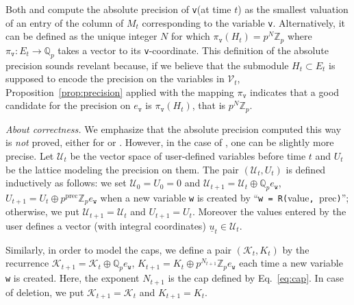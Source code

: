 \documentclass[sigconf]{acmart}
\newcommand{\Z}{\mathbb Z}
\newcommand{\Zp}{\Z_p}
\newcommand{\Q}{\mathbb Q}
\newcommand{\Qp}{\Q_p}
\newcommand{\calV}{\mathcal{V}}
\newcommand{\ttv}{\texttt{v}\xspace}
\newcommand{\ttw}{\texttt{w}\xspace}
\newcommand{\calU}{\mathcal{U}}
\newcommand{\calK}{\mathcal{K}}
\newcommand{\ZpLC}{\text{\color{output} \rm \tt ZpLC}\xspace}
\newcommand{\ZpLF}{\text{\color{output} \rm \tt ZpLF}\xspace}
\theoremstyle{definition}
\begin{document}
\noindent
Both \ZpLC and \ZpLF compute the absolute precision of \ttv (at time 
$t$) as the smallest valuation of an entry of the column of $M_t$ 
corresponding to the variable \ttv. Alternatively, it can be defined as 
the unique integer $N$ for which $\pi_\ttv(H_t) = p^N \Zp$ where 
$\pi_\ttv : E_t \to \Qp$ takes a vector to its \ttv-coordinate.
This definition of the absolute precision sounds revelant because, if we 
believe that the submodule $H_t \subset E_t$ is supposed to encode the 
precision on the variables in $\calV_t$, 
Proposition~\ref{prop:precision} applied with the mapping $\pi_\ttv$ 
indicates that a good candidate for the precision on $e_\ttv$ is 
$\pi_\ttv(H_t)$, that is $p^N \Zp$.

\medskip

\noindent \textit{About correctness.}
%
We emphasize that the absolute precision computed this way is \emph{not} 
proved, either for \ZpLF or \ZpLC. However, in the case of \ZpLC, one
can be slightly more precise. Let $\calU_t$ be the vector space of 
user-defined variables before time $t$ and $U_t$ be the lattice
modeling the precision on them. The pair $(\calU_t, U_t)$ is defined 
inductively as follows: we set $\calU_0 = U_0 = 0$ and 
$\calU_{t+1} = \calU_t \oplus \Qp e_\ttw$,
$U_{t+1} = U_t \oplus p^{\text{prec}} \Zp e_\ttw$
when a new variable \ttw is created by
``\verb?w = R(?value\verb?, ?prec\verb?)?''; otherwise, we put 
$\calU_{t+1} = \calU_t$ and $U_{t+1} = U_t$. Moreover the values
entered by the user defines a vector (with integral coordinates)
$\underline u_t \in \calU_t$.

Similarly, in order to model the caps, we define a pair $(\calK_t, 
K_t)$ by the recurrence $\calK_{t+1} = \calK_t \oplus \Qp e_\ttw$,
$K_{t+1} = K_t \oplus p^{N_{t+1}} \Zp e_\ttw$
each time a new variable \ttw is created. 
Here, the exponent $N_{t+1}$ is the cap defined by Eq.~\eqref{eq:cap}.
In case of deletion, we put $\calK_{t+1} = \calK_t$ and $K_{t+1} = K_t$.
\end{document}
